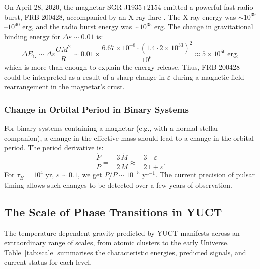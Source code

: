 \documentclass[12pt]{article}
\theoremstyle{remark}
\newcommand{\eps}{\varepsilon}
\begin{document}
	On April 28, 2020, the magnetar SGR J1935+2154 emitted a powerful fast radio burst, FRB 200428, accompanied by an X-ray flare \cite{Geng2020}. The X-ray energy was $\sim 10^{39}$–$10^{40}$ erg, and the radio burst energy was $\sim 10^{35}$ erg. The change in gravitational binding energy for $\Delta\eps \sim 0.01$ is:
	\begin{equation}
		\Delta E_G \sim \Delta\eps \frac{GM^2}{R} \sim 0.01 \times \frac{6.67\times10^{-8} \cdot (1.4\cdot 2\times10^{33})^2}{10^6} \approx 5\times10^{50}\ \text{erg},
	\end{equation}
	which is more than enough to explain the energy release. Thus, FRB 200428 could be interpreted as a result of a sharp change in $\eps$ during a magnetic field rearrangement in the magnetar's crust.
	
	\subsubsection{Change in Orbital Period in Binary Systems}
	\label{subsubsec:magnetars-binary}
	
	For binary systems containing a magnetar (e.g., with a normal stellar companion), a change in the effective mass should lead to a change in the orbital period. The period derivative is:
	\begin{equation}
		\frac{\dot{P}}{P} = -\frac{3}{2} \frac{\dot{M}}{M} \approx -\frac{3}{2} \frac{\dot{\eps}}{1+\eps}.
		\label{eq:pdot}
	\end{equation}
	For $\tau_B = 10^4$ yr, $\eps \sim 0.1$, we get $\dot{P}/P \sim 10^{-5}$ yr$^{-1}$. The current precision of pulsar timing allows such changes to be detected over a few years of observation.
	
	\subsection{The Scale of Phase Transitions in YUCT}
	\label{subsec:scale}
	
	The temperature-dependent gravity predicted by YUCT manifests across an extraordinary range of scales, from atomic clusters to the early Universe. Table~\ref{tab:scale} summarises the characteristic energies, predicted signals, and current status for each level.
	
\end{document}
